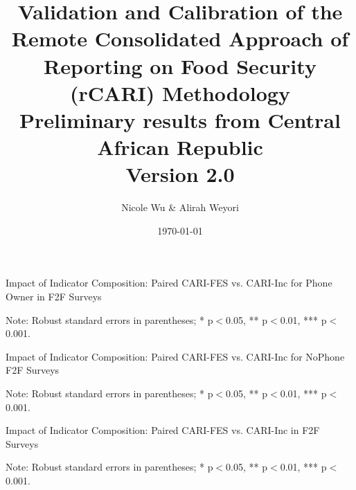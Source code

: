 \documentclass[11pt,harvard]{article}
\author{Nicole Wu \& Alirah Weyori}
\date{\today}
\title{Validation and Calibration of the Remote Consolidated Approach of Reporting on Food Security (rCARI) Methodology 
	\\ {\normalsize Preliminary results from Central African Republic} 
	\\{\normalsize{Version 2.0}} }
\begin{document}
	\maketitle \vspace{-1cm}
	\onehalfspacing
	\pagebreak
	\setlength{\parskip}{6pt} %
	\tableofcontents
	\pagebreak
	
\begin{table}[htbp]
	\centering
	\begin{adjustbox}{max width=\textwidth}
		\begin{threeparttable}
			\caption{Impact of Indicator Composition: Paired CARI-FES vs. CARI-Inc for Phone Owner in F2F Surveys}
			\scriptsize
			 
			\label{tab:CAR_F2F_Paired_OwnPhone_ttest}
			\begin{tablenotes}
				\item Note: Robust standard errors in parentheses; * p$<$0.05, ** p$<$0.01, *** p$<$0.001. 
			\end{tablenotes}
		\end{threeparttable}
	\end{adjustbox}
\end{table}


\begin{table}[htbp]
	\centering
	\begin{adjustbox}{max width=\textwidth}
		\begin{threeparttable}
			\caption{Impact of Indicator Composition: Paired CARI-FES vs. CARI-Inc for NoPhone F2F Surveys}
			\scriptsize
			 
			\label{tab:CAR_F2F_Paired_NoPhone_ttest}
			\begin{tablenotes}
				\item Note: Robust standard errors in parentheses; * p$<$0.05, ** p$<$0.01, *** p$<$0.001. 
			\end{tablenotes}
		\end{threeparttable}
	\end{adjustbox}
\end{table}

\begin{table}[htbp]
	\centering
	\begin{adjustbox}{max width=\textwidth}
		\begin{threeparttable}
			\caption{Impact of Indicator Composition: Paired CARI-FES vs. CARI-Inc in F2F Surveys}
			\scriptsize
			 
			\label{tab:CAR_F2F_Paired_ttest}
			\begin{tablenotes}
				\item Note: Robust standard errors in parentheses; * p$<$0.05, ** p$<$0.01, *** p$<$0.001. 
			\end{tablenotes}
		\end{threeparttable}
	\end{adjustbox}
\end{table}
\end{document}
